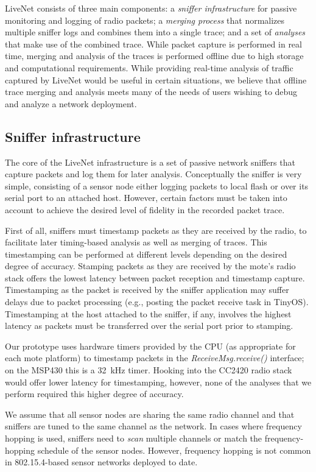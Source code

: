 LiveNet consists of three main components: a {\em sniffer
infrastructure} for passive monitoring and logging of radio packets; 
a {\em merging process} that normalizes multiple sniffer logs and 
combines them into a single trace; and a set of {\em analyses} 
that make use of the combined trace. 
While packet capture is performed in real time, merging and analysis
of the traces is performed offline due to high storage and
computational requirements. While providing real-time analysis
of traffic captured by LiveNet would be useful in certain situations,
we believe that offline trace merging and analysis meets many of the
needs of users wishing to debug and analyze a network deployment.

\subsection{Sniffer infrastructure}

The core of the LiveNet infrastructure is a set of passive network
sniffers that capture packets and log them for later analysis.
Conceptually the sniffer is very simple, consisting of a sensor node
either logging packets to local flash or over its serial port to an
attached host. However, certain factors
must be taken into account to achieve the desired level of fidelity in
the recorded packet trace.

First of all, sniffers must timestamp packets as they are received 
by the radio, to facilitate later timing-based analysis as well as 
merging of traces. This timestamping can be performed at different
levels depending on the desired degree of accuracy. Stamping packets
as they are received by the mote's radio stack offers the lowest
latency between packet reception and timestamp capture. Timestamping
as the packet is received by the sniffer application may suffer
delays due to packet processing (e.g., posting the packet receive
task in TinyOS). Timestamping at the host attached to the sniffer, 
if any, involves the highest latency as packets must be transferred
over the serial port prior to stamping.

Our prototype uses hardware timers provided by the CPU (as 
appropriate for each mote platform) to timestamp packets in the 
{\em ReceiveMsg.receive()} interface; on the MSP430 this is a 32~kHz timer. 
Hooking into the CC2420 radio stack would offer lower latency for
timestamping, however, none of the analyses that we perform required
this higher degree of accuracy.

We assume that all sensor nodes are sharing
the same radio channel and that sniffers are tuned to the same
channel as the network. In cases where frequency hopping is used,
sniffers need to {\em scan} multiple channels or match the
frequency-hopping schedule of the sensor nodes. However, frequency hopping 
is not common in 802.15.4-based sensor networks deployed to date. 

